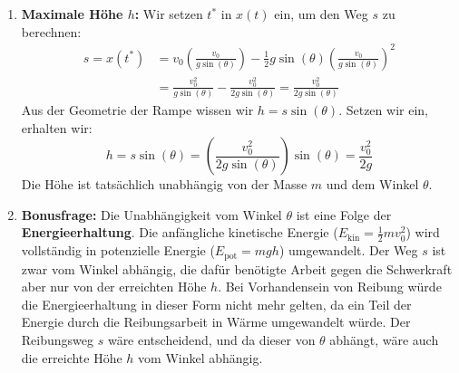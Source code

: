 \documentclass[ngerman]{scrreprt}
\newenvironment{loesungbox}[1]
  {\needspace{5\baselineskip}\begin{loesungboxstyle}[frametitle={#1}]}
  {\end{loesungboxstyle}}
\begin{document}
\begin{loesungbox}{Lösung zu \Cref{aufg:schiefe_ebene}}
\begin{enumerate}
    \item \textbf{Maximale Höhe $h$:}
    Wir setzen $t^*$ in $x(t)$ ein, um den Weg $s$ zu berechnen: 
    \begin{align}
        s = x(t^*) &= v_0 \left(\frac{v_0}{g \sin(\theta)}\right) - \frac{1}{2}g \sin(\theta) \left(\frac{v_0}{g \sin(\theta)}\right)^2 \\
        &= \frac{v_0^2}{g \sin(\theta)} - \frac{v_0^2}{2g \sin(\theta)} = \frac{v_0^2}{2g \sin(\theta)} \label{eq: s_schief}
    \end{align}
    Aus der Geometrie der Rampe wissen wir $h = s \sin(\theta)$. Setzen wir  ein, erhalten wir: 
    \begin{equation}
        h = s \sin(\theta) = \left(\frac{v_0^2}{2g \sin(\theta)}\right) \sin(\theta) = \frac{v_0^2}{2g} \label{eq: h_schief}
    \end{equation}
    Die Höhe ist tatsächlich unabhängig von der Masse $m$ und dem Winkel $\theta$.
    
    \item \textbf{Bonusfrage:}
    Die Unabhängigkeit vom Winkel $\theta$ ist eine Folge der \textbf{Energieerhaltung}. Die anfängliche kinetische Energie ($E_{\text{kin}} = \frac{1}{2}mv_0^2$) wird vollständig in potenzielle Energie ($E_{\text{pot}} = mgh$) umgewandelt. Der Weg $s$ ist zwar vom Winkel abhängig, die dafür benötigte Arbeit gegen die Schwerkraft aber nur von der erreichten Höhe $h$. Bei Vorhandensein von Reibung würde die Energieerhaltung in dieser Form nicht mehr gelten, da ein Teil der Energie durch die Reibungsarbeit in Wärme umgewandelt würde. Der Reibungsweg $s$ wäre entscheidend, und da dieser von $\theta$ abhängt, wäre auch die erreichte Höhe $h$ vom Winkel abhängig. 
\end{enumerate}
\end{loesungbox}
\end{document}
